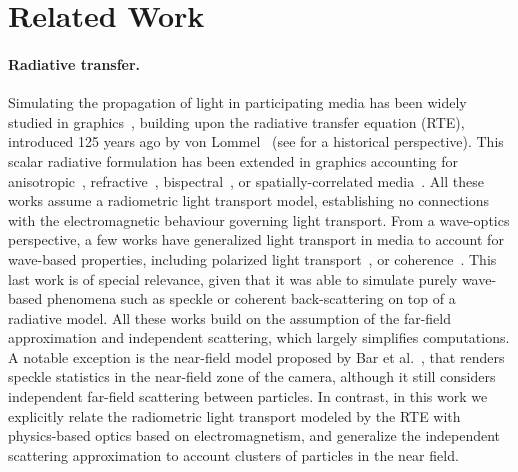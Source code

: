 \section{Related Work}
\label{sec:prior}
%
\paragraph{Radiative transfer. } 
Simulating the propagation of light in participating media has been widely studied in graphics~\cite{novak2018monte}, building upon the radiative transfer equation (RTE), introduced 125 years ago by von Lommel~ (see \cite{mishchenko2013125} for a historical perspective). 
%
This scalar radiative formulation has been extended in graphics accounting for anisotropic~\cite{jakob2010radiative}, refractive~\cite{ament2014refractive}, bispectral~\cite{gutierrez2008visualizing}, or spatially-correlated media~\cite{jarabo2018radiative,bitterli2018radiative}. All these works assume a radiometric light transport model, establishing no connections with the electromagnetic behaviour governing light transport. 
%
From a wave-optics perspective, a few works have generalized light transport in media to account for wave-based properties, including polarized light transport~\cite{wilkie2001combined,Jarabo2018bidirectional}, or coherence~\cite{bar2019monte}. This last work is of special relevance, given that it was able to simulate purely wave-based phenomena such as speckle or coherent back-scattering on top of a radiative model. 
%
All these works build on the assumption of the far-field approximation and independent scattering, which largely simplifies computations. A notable exception is the near-field model proposed by Bar et al.~, that renders speckle statistics in the near-field zone of the camera, although it still considers independent far-field scattering between particles. In contrast, in this work we explicitly relate the radiometric light transport modeled by the RTE with physics-based optics based on electromagnetism, and generalize the independent scattering approximation to account clusters of particles in the near field. 



